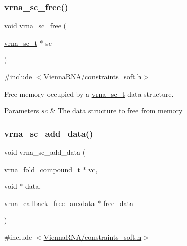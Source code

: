 \subsubsection{\texorpdfstring{vrna\+\_\+sc\+\_\+free()}{vrna\_sc\_free()}}
{\footnotesize\ttfamily void vrna\+\_\+sc\+\_\+free (\begin{DoxyParamCaption}\item[{\mbox{\hyperlink{group__soft__constraints_ga75401ce219ef8dbcceb672db82d434c6}{vrna\+\_\+sc\+\_\+t}} $\ast$}]{sc }\end{DoxyParamCaption})}



{\ttfamily \#include $<$\mbox{\hyperlink{constraints__soft_8h}{Vienna\+R\+N\+A/constraints\+\_\+soft.\+h}}$>$}



Free memory occupied by a \mbox{\hyperlink{group__soft__constraints_ga75401ce219ef8dbcceb672db82d434c6}{vrna\+\_\+sc\+\_\+t}} data structure. 


\begin{DoxyParams}{Parameters}
{\em sc} & The data structure to free from memory \\
\hline
\end{DoxyParams}
\mbox{\label{group__soft__constraints_ga15c6d52471ec97897e2bb7f964f5deb6}} 
\subsubsection{\texorpdfstring{vrna\+\_\+sc\+\_\+add\+\_\+data()}{vrna\_sc\_add\_data()}}
{\footnotesize\ttfamily void vrna\+\_\+sc\+\_\+add\+\_\+data (\begin{DoxyParamCaption}\item[{\mbox{\hyperlink{group__fold__compound_ga1b0cef17fd40466cef5968eaeeff6166}{vrna\+\_\+fold\+\_\+compound\+\_\+t}} $\ast$}]{vc,  }\item[{void $\ast$}]{data,  }\item[{\mbox{\hyperlink{group__fold__compound_ga7806651f51b195013839a218b3bbd5a3}{vrna\+\_\+callback\+\_\+free\+\_\+auxdata}} $\ast$}]{free\+\_\+data }\end{DoxyParamCaption})}



{\ttfamily \#include $<$\mbox{\hyperlink{constraints__soft_8h}{Vienna\+R\+N\+A/constraints\+\_\+soft.\+h}}$>$}



